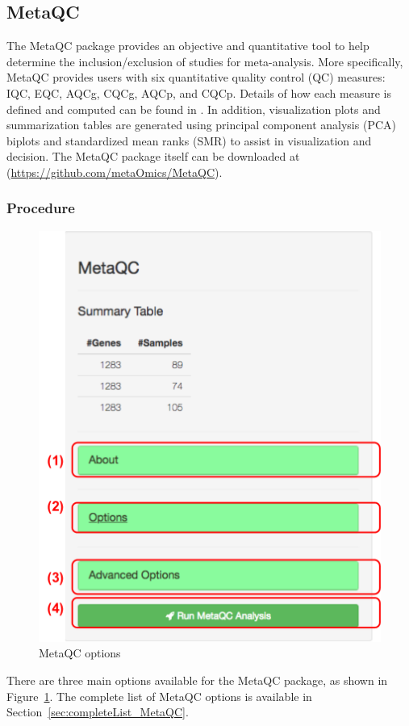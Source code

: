 \subsection{MetaQC}
The MetaQC package provides an objective and quantitative tool to help determine the inclusion/exclusion of studies for meta-analysis. More specifically, MetaQC provides users with six quantitative quality control (QC) measures:  IQC, EQC, AQCg, CQCg, AQCp, and CQCp. Details of how each measure is defined and computed can be found in \cite{kang2012metaqc}. In addition, visualization plots and summarization tables are generated using principal component analysis (PCA) biplots and standardized mean ranks (SMR) to assist in visualization and decision. 
The MetaQC package itself can be downloaded at (\url{https://github.com/metaOmics/MetaQC}). 
\subsubsection{Procedure}

\begin{figure}[H]
\begin{center}
\includegraphics[scale=0.5]{./figure/metaQC/metaQCoption.pdf}
\caption{MetaQC options}
\label{fig:MetaQCoption}
\end{center}
\end{figure}
There are three main options available for the MetaQC package, 
as shown in Figure~\ref{fig:MetaQCoption}. 
The complete list of MetaQC options is available in Section~\ref{sec:completeList_MetaQC}.

